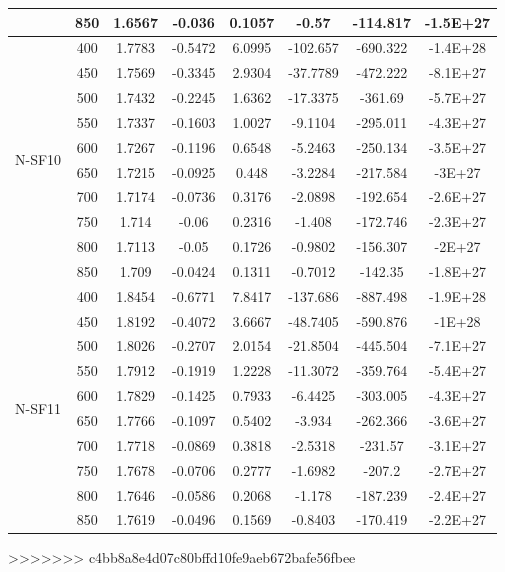 {\begin{longtable}{cccccccc}
                          & 850 & 1.6567 & -0.036  & 0.1057 & -0.57    & -114.817 & -1.5E+27 \\ \hline
\multirow{10}{*}{N-SF10}  & 400 & 1.7783 & -0.5472 & 6.0995 & -102.657 & -690.322 & -1.4E+28 \\
                          & 450 & 1.7569 & -0.3345 & 2.9304 & -37.7789 & -472.222 & -8.1E+27 \\
                          & 500 & 1.7432 & -0.2245 & 1.6362 & -17.3375 & -361.69  & -5.7E+27 \\
                          & 550 & 1.7337 & -0.1603 & 1.0027 & -9.1104  & -295.011 & -4.3E+27 \\
                          & 600 & 1.7267 & -0.1196 & 0.6548 & -5.2463  & -250.134 & -3.5E+27 \\
                          & 650 & 1.7215 & -0.0925 & 0.448  & -3.2284  & -217.584 & -3E+27   \\
                          & 700 & 1.7174 & -0.0736 & 0.3176 & -2.0898  & -192.654 & -2.6E+27 \\
                          & 750 & 1.714  & -0.06   & 0.2316 & -1.408   & -172.746 & -2.3E+27 \\
                          & 800 & 1.7113 & -0.05   & 0.1726 & -0.9802  & -156.307 & -2E+27   \\
                          & 850 & 1.709  & -0.0424 & 0.1311 & -0.7012  & -142.35  & -1.8E+27 \\ \hline
\multirow{10}{*}{N-SF11}  & 400 & 1.8454 & -0.6771 & 7.8417 & -137.686 & -887.498 & -1.9E+28 \\
                          & 450 & 1.8192 & -0.4072 & 3.6667 & -48.7405 & -590.876 & -1E+28   \\
                          & 500 & 1.8026 & -0.2707 & 2.0154 & -21.8504 & -445.504 & -7.1E+27 \\
                          & 550 & 1.7912 & -0.1919 & 1.2228 & -11.3072 & -359.764 & -5.4E+27 \\
                          & 600 & 1.7829 & -0.1425 & 0.7933 & -6.4425  & -303.005 & -4.3E+27 \\
                          & 650 & 1.7766 & -0.1097 & 0.5402 & -3.934   & -262.366 & -3.6E+27 \\
                          & 700 & 1.7718 & -0.0869 & 0.3818 & -2.5318  & -231.57  & -3.1E+27 \\
                          & 750 & 1.7678 & -0.0706 & 0.2777 & -1.6982  & -207.2   & -2.7E+27 \\
                          & 800 & 1.7646 & -0.0586 & 0.2068 & -1.178   & -187.239 & -2.4E+27 \\
                          & 850 & 1.7619 & -0.0496 & 0.1569 & -0.8403  & -170.419 & -2.2E+27
\end{longtable}

}
>>>>>>> c4bb8a8e4d07c80bffd10fe9aeb672bafe56fbee
